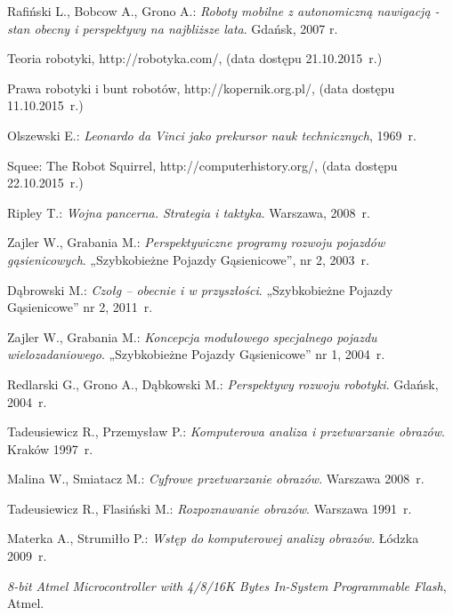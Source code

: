 \begin{thebibliography}{9}

Rafiński L., Bobcow A., Grono A.: \emph{Roboty mobilne z autonomiczną nawigacją - stan obecny i perspektywy na najbliższe lata}. Gdańsk, 2007 r.  

Teoria robotyki, http://robotyka.com/, (data dostępu 21.10.2015~r.)

Prawa robotyki i bunt robotów, http://kopernik.org.pl/, (data dostępu 11.10.2015~r.)

Olszewski E.: \emph{Leonardo da Vinci jako prekursor nauk technicznych}, 1969~r.

Squee: The Robot Squirrel, http://computerhistory.org/, (data dostępu 22.10.2015~r.)

Ripley T.: \emph{Wojna pancerna. Strategia i taktyka}. Warszawa, 2008~r.

Zajler W., Grabania M.: \emph{Perspektywiczne programy rozwoju pojazdów gąsienicowych}. „Szybkobieżne Pojazdy Gąsienicowe”, nr 2, 2003~r.

Dąbrowski M.: \emph{Czołg – obecnie i w przyszłości}. „Szybkobieżne Pojazdy Gąsienicowe” nr 2, 2011~r.

Zajler W., Grabania M.: \emph{Koncepcja modułowego specjalnego pojazdu wielozadaniowego}. „Szybkobieżne Pojazdy Gąsienicowe” nr 1, 2004~r.

Redlarski G., Grono A., Dąbkowski M.: \emph{Perspektywy rozwoju robotyki}. Gdańsk, 2004~r.

Tadeusiewicz R., Przemysław P.: \emph{Komputerowa analiza i przetwarzanie obrazów}. Kraków 1997~r.

Malina W., Smiatacz M.: \emph{Cyfrowe przetwarzanie obrazów}. Warszawa 2008~r.

Tadeusiewicz R., Flasiński M.: \emph{Rozpoznawanie obrazów}. Warszawa 1991~r.

Materka A., Strumiłło P.: \emph{Wstęp do komputerowej analizy obrazów}. Łódzka 2009~r.

\emph{8-bit Atmel Microcontroller with 4/8/16K Bytes In-System Programmable Flash}, Atmel.

\end{thebibliography}
